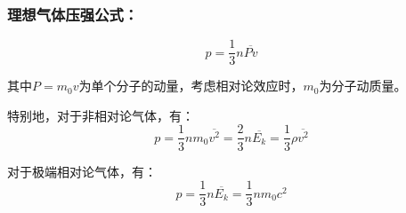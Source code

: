 \documentclass[zihao=5,UTF8]{report}
\begin{document}
\subsubsection{理想气体压强公式：}\noindent
\begin{equation}
    p= \frac{1}{3}n \overline{Pv} 
    \label{理想气体压强公式}
\end{equation}\par
{\color{gray}\small 其中$P = m_0v$为单个分子的动量，考虑相对论效应时，$m_0$为分子动质量。}\par
特别地，对于非相对论气体，有：
\begin{equation}
    p = \frac{1}{3}nm_0\overline{v^2} = \frac{2}{3}n\overline{E_k} = \frac{1}{3}\rho \overline{v^2} 
\end{equation}\par
对于极端相对论气体，有：
\begin{equation}
    p = \frac{1}{3}n\overline{E_k} = \frac{1}{3}nm_0c^2
\end{equation}
\end{document}
